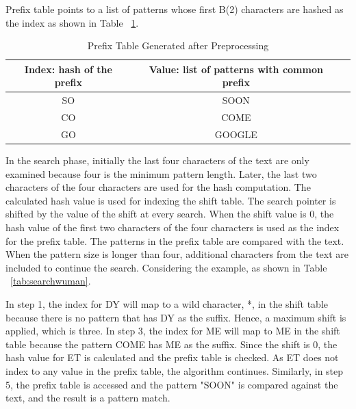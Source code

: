 Prefix table points to a list of patterns whose first B(2) characters are hashed as the index as shown in Table ~\ref{tab:prefix}.

\begin{table}[H]
\centering
\caption {Prefix Table Generated after Preprocessing} \label{tab:prefix}
\begin{tabular}{|c|c|c|}
\midrule
Index: hash of the prefix & Value: list of patterns with common prefix \\
\midrule
SO & SOON  \\
\midrule
CO & COME  \\
\midrule
GO & GOOGLE  \\
\midrule
\end{tabular}
\end{table}
\squeezeup

In the search phase, initially the last four characters of the text are only examined because four is the minimum pattern length. Later, the last two characters of the four characters are used for the hash computation. The calculated hash value is used for indexing the shift table. The search pointer is shifted by the value of the shift at every search. When the shift value is 0, the hash value of the first two characters of the four characters is used as the index for the prefix table. The patterns in the prefix table are compared with the text. When the pattern size is longer than four, additional characters from the text are included to continue the search. Considering the example, as shown in Table ~\ref{tab:searchwuman}.

In step 1, the index for DY will map to a wild character, *, in the shift table  because there is no pattern that has DY as the suffix. Hence, a maximum shift is applied, which is three.
In step 3, the index for ME will map to ME in the shift table because the pattern COME has ME as the suffix. Since the shift is 0, the hash value for ET is calculated and the prefix table is checked. As ET does not index to any value in the prefix table, the algorithm continues. Similarly, in step 5, the prefix table is accessed and the pattern "SOON" is compared against the text, and the result is a pattern match. 

